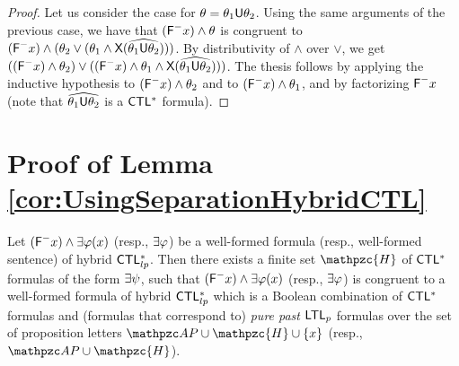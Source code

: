 \begin{proof}
Let us consider the case for $\theta =\theta_1\textsf{U} \theta_2$. Using the same arguments of the previous case, we have that
 $(\textsf{F}^{-} x)\wedge \theta$ is congruent to $(\textsf{F}^{-} x)\wedge (\theta_2 \vee (\theta_1\wedge\textsf{X} (\widehat{\theta_1\textsf{U} \theta_2})))$. By distributivity of $\wedge$ over $\vee$, we get $((\textsf{F}^{-} x)\wedge\theta_2) \vee ((\textsf{F}^{-} x)\wedge\theta_1\wedge\textsf{X} (\widehat{\theta_1\textsf{U} \theta_2})))$. The thesis follows by applying the inductive hypothesis to $(\textsf{F}^{-} x)\wedge\theta_2$ and to $(\textsf{F}^{-} x)\wedge\theta_1$, and by factorizing $\textsf{F}^{-} x$ (note that $\widehat{\theta_1\textsf{U} \theta_2}$ is a $\text{\sffamily CTL$^{*}$}$ formula).
\end{proof}


\section{Proof of Lemma \ref{cor:UsingSeparationHybridCTL}}\label{proof:cor:UsingSeparationHybridCTL}

\begin{lemma*}[\ref{cor:UsingSeparationHybridCTL}] Let $(\textsf{F}^{-} x)\wedge \exists \varphi(x)$ (resp., $\exists\varphi$) be a well-formed formula (resp., well-formed sentence) of hybrid $\text{\sffamily CTL$^{*}_{lp}$}$.  Then there exists a finite set $\mathpzc{H}$ of $\text{\sffamily CTL$^{*}$}$ formulas of the form $\exists\psi$, such that $(\textsf{F}^{-} x)\wedge \exists \varphi(x)$ (resp., $\exists\varphi$) is congruent to a well-formed formula of hybrid $\text{\sffamily CTL$^{*}_{lp}$}$ which is a Boolean combination of $\text{\sffamily CTL$^{*}$}$ formulas and (formulas that
correspond to) \emph{pure past}  $\text{\sffamily LTL$_p$}$ formulas over the set of proposition letters $\Prop\cup  \mathpzc{H} \cup \{x\}$ (resp., $\Prop\cup  \mathpzc{H}$).
\end{lemma*} 

